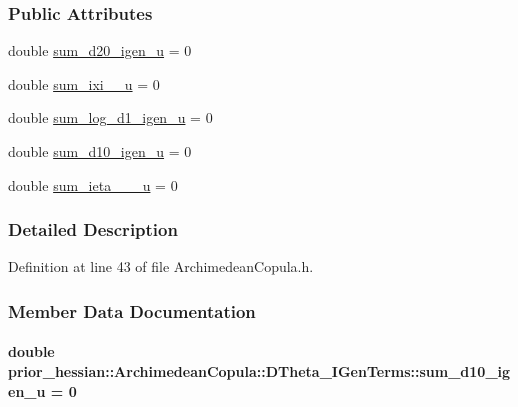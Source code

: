 \subsubsection*{Public Attributes}
\begin{DoxyCompactItemize}
\item 
double \hyperlink{structprior__hessian_1_1ArchimedeanCopula_1_1D2Theta__IGenTerms_a21795b6764f7b5034c4b7118bc6efbab}{sum\+\_\+d20\+\_\+igen\+\_\+u} = 0
\item 
double \hyperlink{structprior__hessian_1_1ArchimedeanCopula_1_1D2Theta__IGenTerms_ac21f6a61609d5b1b1e577a660115f8a9}{sum\+\_\+ixi\+\_\+\_\+u} = 0
\item 
double \hyperlink{structprior__hessian_1_1ArchimedeanCopula_1_1DTheta__IGenTerms_aa92089ec503423453715423320611ac6}{sum\+\_\+log\+\_\+d1\+\_\+igen\+\_\+u} = 0
\item 
double \hyperlink{structprior__hessian_1_1ArchimedeanCopula_1_1DTheta__IGenTerms_a5f3cdeb0ee5ce6746c9aa9361cfd63c5}{sum\+\_\+d10\+\_\+igen\+\_\+u} = 0
\item 
double \hyperlink{structprior__hessian_1_1ArchimedeanCopula_1_1DTheta__IGenTerms_a11654a086a49357a64d6b002a3f67f56}{sum\+\_\+ieta\+\_\+\_\+\_\+u} = 0
\end{DoxyCompactItemize}


\subsubsection{Detailed Description}


Definition at line 43 of file Archimedean\+Copula.\+h.



\subsubsection{Member Data Documentation}
\paragraph[{\texorpdfstring{sum\+\_\+d10\+\_\+igen\+\_\+u}{sum_d10_igen_u}}]{\setlength{\rightskip}{0pt plus 5cm}double prior\+\_\+hessian\+::\+Archimedean\+Copula\+::\+D\+Theta\+\_\+\+I\+Gen\+Terms\+::sum\+\_\+d10\+\_\+igen\+\_\+u = 0\hspace{0.3cm}{\ttfamily [inherited]}}\hypertarget{structprior__hessian_1_1ArchimedeanCopula_1_1DTheta__IGenTerms_a5f3cdeb0ee5ce6746c9aa9361cfd63c5}{}\label{structprior__hessian_1_1ArchimedeanCopula_1_1DTheta__IGenTerms_a5f3cdeb0ee5ce6746c9aa9361cfd63c5}


